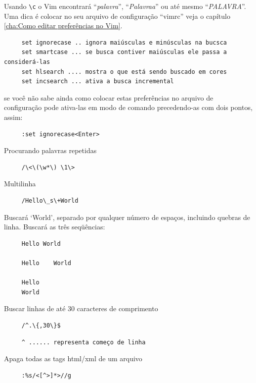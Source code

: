 \documentclass[10pt,a4paper,openany]{book}
\begin{document}
Usando \verb|\c| o Vim encontrará ``{\em{palavra}}'', ``{\em{Palavraa}}'' ou
até mesmo ``{\em{PALAVRA}}''. Uma dica é colocar no seu arquivo de
configuração ``vimrc'' veja o capítulo \ref{cha:Como editar preferências no Vim}.

\begin{verbatim}
     set ignorecase .. ignora maiúsculas e minúsculas na bucsca
     set smartcase ... se busca contiver maiúsculas ele passa a considerá-las
     set hlsearch .... mostra o que está sendo buscado em cores
     set incsearch ... ativa a busca incremental
\end{verbatim}

se você não sabe ainda como colocar estas preferências no arquivo de configuração pode
ativa-las em modo de comando precedendo-as com dois pontos, assim:

\begin{verbatim}
     :set ignorecase<Enter>
\end{verbatim}

Procurando palavras repetidas

\begin{verbatim}
     /\<\(\w*\) \1\>
\end{verbatim}

Multilinha

\begin{verbatim}
     /Hello\_s\+World
\end{verbatim}

Buscará `World', separado por qualquer número de espaços,
incluindo quebras de linha. Buscará as três seqüências:

\begin{verbatim}
     Hello World
     
     Hello    World
     
     Hello
     World
\end{verbatim}

Buscar linhas de até 30 caracteres de comprimento

\begin{verbatim}
     /^.\{,30\}$
\end{verbatim}

\begin{verbatim}
     ^ ...... representa começo de linha
\end{verbatim}

Apaga todas as tags html/xml de um arquivo

\begin{verbatim}
     :%s/<[^>]*>//g
\end{verbatim}
\end{document}
